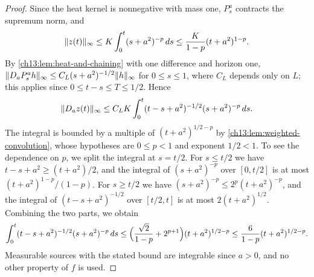 \begin{proof}
Since the heat kernel is nonnegative with mass one, $P^a_s$ contracts the supremum norm, and
\[
 \lVert z(t)\rVert_\infty\le K\int_0^t(s+a^2)^{-p}\,ds\le\frac{K}{1-p}(t+a^2)^{1-p}.
\]
By \cref{ch13:lem:heat-and-chaining} with one difference and horizon one, $\lVert D_aP^a_sh\rVert_\infty\le C_L(s+a^2)^{-1/2}\lVert h\rVert_\infty$ for $0\le s\le1$, where $C_L$ depends only on $L$; this applies since $0\le t-s\le T\le1/2$. Hence
\[
 \lVert D_az(t)\rVert_\infty\le C_LK\int_0^t(t-s+a^2)^{-1/2}(s+a^2)^{-p}\,ds .
\]
The integral is bounded by a multiple of $(t+a^2)^{1/2-p}$ by \cref{ch13:lem:weighted-convolution}, whose hypotheses are $0\le p<1$ and exponent $1/2<1$. To see the dependence on $p$, we split the integral at $s=t/2$. For $s\le t/2$ we have $t-s+a^2\ge(t+a^2)/2$, and the integral of $(s+a^2)^{-p}$ over $[0,t/2]$ is at most $(t+a^2)^{1-p}/(1-p)$. For $s\ge t/2$ we have $(s+a^2)^{-p}\le2^p(t+a^2)^{-p}$, and the integral of $(t-s+a^2)^{-1/2}$ over $[t/2,t]$ is at most $2(t+a^2)^{1/2}$. Combining the two parts, we obtain
\[
 \int_0^t(t-s+a^2)^{-1/2}(s+a^2)^{-p}\,ds\le\Bigl(\frac{\sqrt2}{1-p}+2^{p+1}\Bigr)(t+a^2)^{1/2-p}\le\frac{6}{1-p}(t+a^2)^{1/2-p}.
\]
Measurable sources with the stated bound are integrable since $a>0$, and no other property of $f$ is used.
\end{proof}

